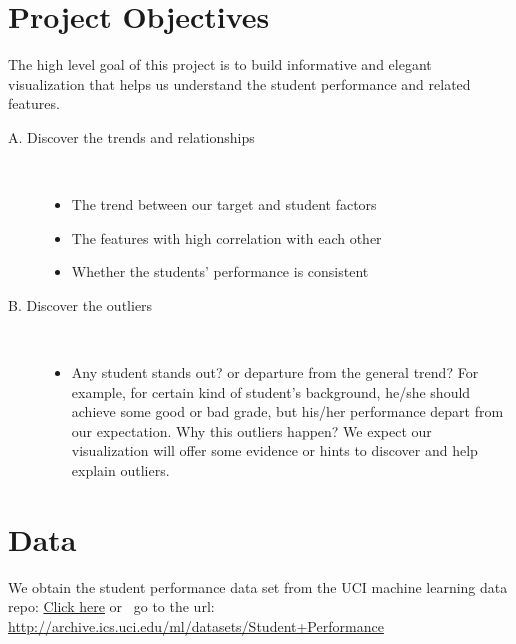 \documentclass{article}
\begin{document}
\section{Project Objectives}
The high level goal of this project is to build informative and elegant visualization that helps us understand the student performance and related features.
\begin{description}
\item [A. Discover the trends and relationships]  \
\begin{itemize}
\item The trend between our target and student factors
\item The features with high correlation with each other
\item Whether the students' performance is consistent
\end{itemize}

\item [B. Discover the outliers]  \
\begin{itemize}
\item Any student stands out? or departure from the general trend? For example, for certain kind of student's background, he/she should achieve some good or bad grade, but his/her performance depart from our expectation. Why this outliers happen? We expect our visualization will offer some evidence or hints to discover and help explain outliers.
\end{itemize}
\end{description}

\section{Data}
We obtain the student performance data set from the UCI machine learning data repo: \href{http://archive.ics.uci.edu/ml/datasets/Student+Performance}{Click here} or \
go to the url: \url{http://archive.ics.uci.edu/ml/datasets/Student+Performance}
\end{document}
